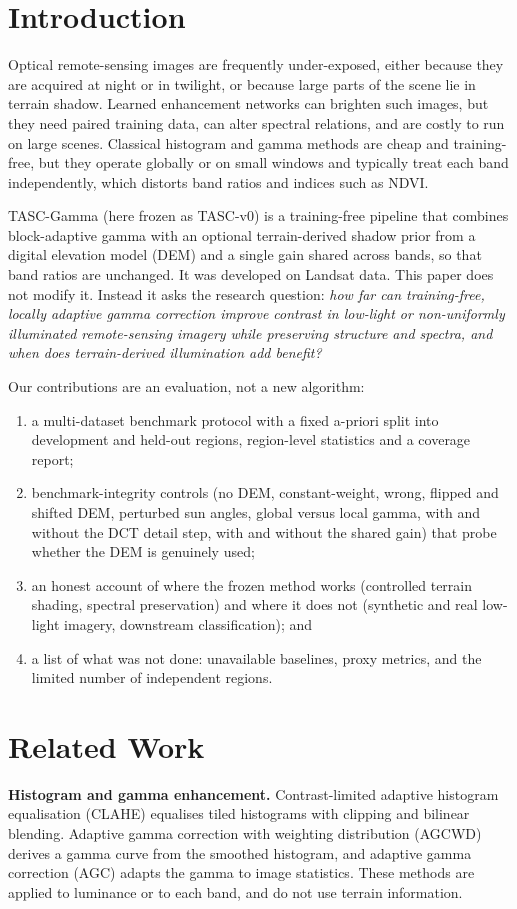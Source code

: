 \documentclass[conference]{IEEEtran}
\begin{document}
\section{Introduction}
Optical remote-sensing images are frequently under-exposed, either because they are acquired at night or in twilight, or because large parts of the scene lie in terrain shadow. Learned enhancement networks can brighten such images, but they need paired training data, can alter spectral relations, and are costly to run on large scenes. Classical histogram and gamma methods are cheap and training-free, but they operate globally or on small windows and typically treat each band independently, which distorts band ratios and indices such as NDVI.

TASC-Gamma (here frozen as TASC-v0) is a training-free pipeline that combines block-adaptive gamma with an optional terrain-derived shadow prior from a digital elevation model (DEM) and a single gain shared across bands, so that band ratios are unchanged. It was developed on Landsat data. This paper does not modify it. Instead it asks the research question: \emph{how far can training-free, locally adaptive gamma correction improve contrast in low-light or non-uniformly illuminated remote-sensing imagery while preserving structure and spectra, and when does terrain-derived illumination add benefit?}

Our contributions are an evaluation, not a new algorithm:

\begin{enumerate}
\item a multi-dataset benchmark protocol with a fixed a-priori split into development and held-out regions, region-level statistics and a coverage report;
\item benchmark-integrity controls (no DEM, constant-weight, wrong, flipped and shifted DEM, perturbed sun angles, global versus local gamma, with and without the DCT detail step, with and without the shared gain) that probe whether the DEM is genuinely used;
\item an honest account of where the frozen method works (controlled terrain shading, spectral preservation) and where it does not (synthetic and real low-light imagery, downstream classification); and
\item a list of what was not done: unavailable baselines, proxy metrics, and the limited number of independent regions.
\end{enumerate}
\section{Related Work}
\textbf{Histogram and gamma enhancement.} Contrast-limited adaptive histogram equalisation (CLAHE) \cite{zuiderveld1994clahe} equalises tiled histograms with clipping and bilinear blending. Adaptive gamma correction with weighting distribution (AGCWD) \cite{huang2013agcwd} derives a gamma curve from the smoothed histogram, and adaptive gamma correction (AGC) \cite{rahman2016agc} adapts the gamma to image statistics. These methods are applied to luminance or to each band, and do not use terrain information.
\end{document}
